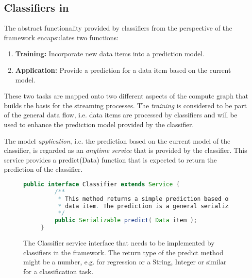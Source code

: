 \subsection{\label{sec:streamsClassifiers}Classifiers in \streams}
The abstract functionality provided by classifiers from the perspective
of the \streams framework encapsulates two functions:
\begin{enumerate}
  \item {\bf Training:} Incorporate new data items into a prediction model.
  \item {\bf Application:} Provide a prediction for a data item based on the current model.
\end{enumerate}
These two tasks are mapped onto two different aspects of the compute
graph that builds the basis for the streaming processes. The {\em
  training} is considered to be part of the general data flow,
i.e. data items are processed by classifiers and will be used to
enhance the prediction model provided by the classifier.

The model {\em application}, i.e. the prediction based on the current
model of the classifier, is regarded as an {\em anytime service} that
is provided by the classifier. This service provides a {\ttfamily
  predict(Data)} function that is expected to return the prediction of
the classifier.

\begin{figure}[h!]
  \centering
  \begin{lstlisting}[language=Java]
     public interface Classifier extends Service {
         /**
          * This method returns a simple prediction based on the given
          * data item. The prediction is a general serializable value.
          */
         public Serializable predict( Data item );
     }
  \end{lstlisting}
  \caption{\label{fig:classifierService}The {\ttfamily Classifier}
    service interface that needs to be implemented by classifiers in
    the \streams framework. The return type of the {\ttfamily predict}
    method might be a number, e.g. for regression or a String, Integer
    or similar for a classification task.}
\end{figure}

